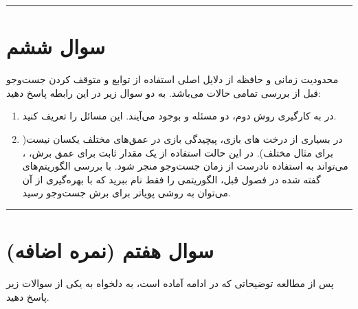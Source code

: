 \documentclass[a4paper,10pt]{article}
\begin{document}
\bigskip
\bigskip
\textcolor{AccentCyan}{\rule{\linewidth}{0.4pt}}
\section{\textcolor{AccentGold}{سوال ششم}}

محدودیت زمانی و حافظه از دلایل اصلی استفاده از توابع  و متوقف کردن جست‌وجو قبل از بررسی تمامی حالات می‌باشد. به دو سوال زیر در این رابطه پاسخ دهید:
\begin{enumerate}
	\renewcommand{\labelenumi}{\textcolor{AccentCyan}{\arabic{enumi}}}
	\item 
	در به کارگیری روش دوم، دو مسئله  و  بوجود می‌آیند. این مسائل را تعریف کنید. 
	\item 
	در بسیاری از درخت های بازی‌، پیچیدگی بازی در عمق‌های مختلف یکسان نیست‌( برای مثال  مختلف). در این حالت استفاده از یک مقدار ثابت برای عمق برش، ، می‌تواند به استفاده نادرست از زمان جست‌وجو منجر شود. با بررسی الگوریتم‌های گفته شده در فصول قبل، الگوریتمی را فقط نام ببرید که با بهره‌گیری از آن می‌توان به روشی پویا‌تر برای برش جست‌وجو رسید. 
\end{enumerate}


\bigskip
\bigskip
\textcolor{AccentCyan}{\rule{\linewidth}{0.4pt}}
\section{\textcolor{AccentGold}{سوال هفتم (نمره اضافه)}}
پس از مطالعه توضیحاتی که در ادامه آماده است، به دلخواه به یکی از سوالات زیر پاسخ دهید.
\end{document}
